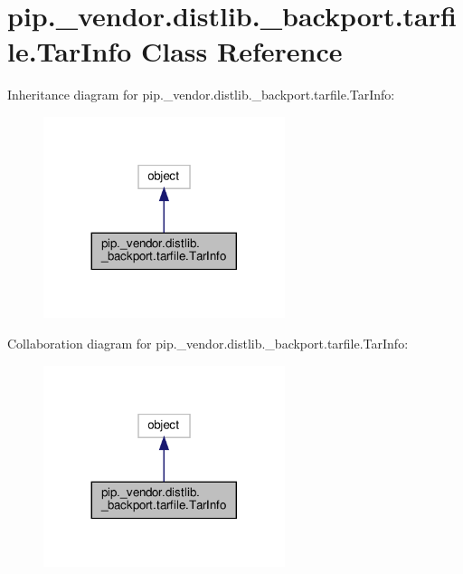 \hypertarget{classpip_1_1__vendor_1_1distlib_1_1__backport_1_1tarfile_1_1TarInfo}{}\section{pip.\+\_\+vendor.\+distlib.\+\_\+backport.\+tarfile.\+Tar\+Info Class Reference}
\label{classpip_1_1__vendor_1_1distlib_1_1__backport_1_1tarfile_1_1TarInfo}


Inheritance diagram for pip.\+\_\+vendor.\+distlib.\+\_\+backport.\+tarfile.\+Tar\+Info\+:
\nopagebreak
\begin{figure}[H]
\begin{center}
\leavevmode
\includegraphics[width=200pt]{classpip_1_1__vendor_1_1distlib_1_1__backport_1_1tarfile_1_1TarInfo__inherit__graph}
\end{center}
\end{figure}


Collaboration diagram for pip.\+\_\+vendor.\+distlib.\+\_\+backport.\+tarfile.\+Tar\+Info\+:
\nopagebreak
\begin{figure}[H]
\begin{center}
\leavevmode
\includegraphics[width=200pt]{classpip_1_1__vendor_1_1distlib_1_1__backport_1_1tarfile_1_1TarInfo__coll__graph}
\end{center}
\end{figure}
